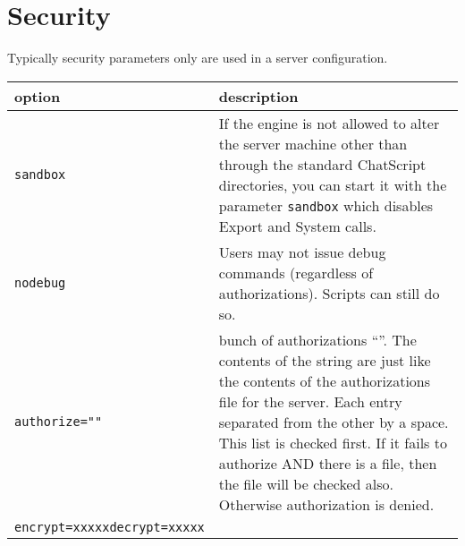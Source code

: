 \documentclass[]{article}
\begin{document}
\section{Security}\label{security}

Typically security parameters only are used in a server configuration.

\begin{longtable}[]{@{}ll@{}}
\toprule
\begin{minipage}[b]{0.18\columnwidth}\raggedright\strut
option\strut
\end{minipage} & \begin{minipage}[b]{0.76\columnwidth}\raggedright\strut
description\strut
\end{minipage}\tabularnewline
\midrule
\endhead
\begin{minipage}[t]{0.18\columnwidth}\raggedright\strut
\texttt{sandbox}\strut
\end{minipage} & \begin{minipage}[t]{0.76\columnwidth}\raggedright\strut
If the engine is not allowed to alter the server machine other than
through the standard ChatScript directories, you can start it with the
parameter \texttt{sandbox} which disables Export and System calls.\strut
\end{minipage}\tabularnewline
\begin{minipage}[t]{0.18\columnwidth}\raggedright\strut
\texttt{nodebug}\strut
\end{minipage} & \begin{minipage}[t]{0.76\columnwidth}\raggedright\strut
Users may not issue debug commands (regardless of authorizations).
Scripts can still do so.\strut
\end{minipage}\tabularnewline
\begin{minipage}[t]{0.18\columnwidth}\raggedright\strut
\texttt{authorize=""}\strut
\end{minipage} & \begin{minipage}[t]{0.76\columnwidth}\raggedright\strut
bunch of authorizations ``''. The contents of the string are just like
the contents of the authorizations file for the server. Each entry
separated from the other by a space. This list is checked first. If it
fails to authorize AND there is a file, then the file will be checked
also. Otherwise authorization is denied.\strut
\end{minipage}\tabularnewline
\begin{minipage}[t]{0.18\columnwidth}\raggedright\strut
\texttt{encrypt=xxxxx}\texttt{decrypt=xxxxx}\strut

\end{minipage}
\end{longtable}
\end{document}

